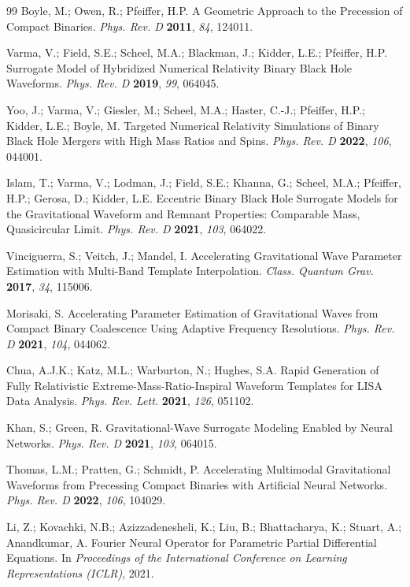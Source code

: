 \documentclass[11pt, a4paper]{article}
\begin{document}
\begin{thebibliography}{99}
Boyle, M.; Owen, R.; Pfeiffer, H.P. A Geometric Approach to the Precession of Compact Binaries. \textit{Phys. Rev. D} \textbf{2011}, \textit{84}, 124011.

Varma, V.; Field, S.E.; Scheel, M.A.; Blackman, J.; Kidder, L.E.; Pfeiffer, H.P. Surrogate Model of Hybridized Numerical Relativity Binary Black Hole Waveforms. \textit{Phys. Rev. D} \textbf{2019}, \textit{99}, 064045.

Yoo, J.; Varma, V.; Giesler, M.; Scheel, M.A.; Haster, C.-J.; Pfeiffer, H.P.; Kidder, L.E.; Boyle, M. Targeted Numerical Relativity Simulations of Binary Black Hole Mergers with High Mass Ratios and Spins. \textit{Phys. Rev. D} \textbf{2022}, \textit{106}, 044001.

Islam, T.; Varma, V.; Lodman, J.; Field, S.E.; Khanna, G.; Scheel, M.A.; Pfeiffer, H.P.; Gerosa, D.; Kidder, L.E. Eccentric Binary Black Hole Surrogate Models for the Gravitational Waveform and Remnant Properties: Comparable Mass, Quasicircular Limit. \textit{Phys. Rev. D} \textbf{2021}, \textit{103}, 064022.

Vinciguerra, S.; Veitch, J.; Mandel, I. Accelerating Gravitational Wave Parameter Estimation with Multi-Band Template Interpolation. \textit{Class. Quantum Grav.} \textbf{2017}, \textit{34}, 115006.

Morisaki, S. Accelerating Parameter Estimation of Gravitational Waves from Compact Binary Coalescence Using Adaptive Frequency Resolutions. \textit{Phys. Rev. D} \textbf{2021}, \textit{104}, 044062.

Chua, A.J.K.; Katz, M.L.; Warburton, N.; Hughes, S.A. Rapid Generation of Fully Relativistic Extreme-Mass-Ratio-Inspiral Waveform Templates for LISA Data Analysis. \textit{Phys. Rev. Lett.} \textbf{2021}, \textit{126}, 051102.

Khan, S.; Green, R. Gravitational-Wave Surrogate Modeling Enabled by Neural Networks. \textit{Phys. Rev. D} \textbf{2021}, \textit{103}, 064015.

Thomas, L.M.; Pratten, G.; Schmidt, P. Accelerating Multimodal Gravitational Waveforms from Precessing Compact Binaries with Artificial Neural Networks. \textit{Phys. Rev. D} \textbf{2022}, \textit{106}, 104029.

Li, Z.; Kovachki, N.B.; Azizzadenesheli, K.; Liu, B.; Bhattacharya, K.; Stuart, A.; Anandkumar, A. Fourier Neural Operator for Parametric Partial Differential Equations. In \textit{Proceedings of the International Conference on Learning Representations (ICLR)}, 2021.


\end{thebibliography}
\end{document}
